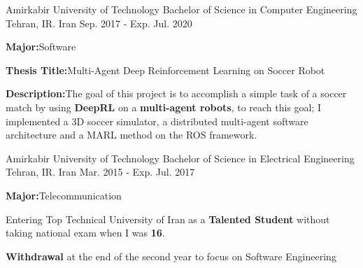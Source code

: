 

\begin{cventries}

  \cventry
    {Amirkabir University of Technology} %
    {Bachelor of Science in Computer Engineering} %
    {Tehran, IR. Iran} %
    {Sep. 2017 - Exp. Jul. 2020} %
    {
      \begin{cvitems} %
        \item {\textbf{Major:}\enskip\enskip\enskip\enskip\enskip\enskip\enskip\enskip Software}
        \item {\textbf{Thesis Title:}\enskip\enskip\enskip Multi-Agent Deep Reinforcement Learning on Soccer Robot}
        \item {\textbf{Description:}\enskip\enskip\enskip The goal of this project is to accomplish a simple task of a soccer match by using \textbf{DeepRL} on a \textbf{multi-agent robots}, to reach this goal; I implemented a 3D soccer simulator, a distributed multi-agent software architecture and a MARL method on the ROS framework.}
      \end{cvitems}
    }

  \cventry
    {Amirkabir University of Technology} %
    {Bachelor of Science in Electrical Engineering} %
    {Tehran, IR. Iran} %
    {Mar. 2015 - Exp. Jul. 2017} %
    {
      \begin{cvitems} %
      \item {\textbf{Major:}\enskip\enskip\enskip Telecommunication}
        \item {Entering Top Technical University of Iran as a \textbf{Talented Student} without taking national exam  when I was \textbf{16}.}
        \item {\textbf{Withdrawal} at the end of the second year to focus on Software Engineering}
      \end{cvitems}
    }

\end{cventries}
